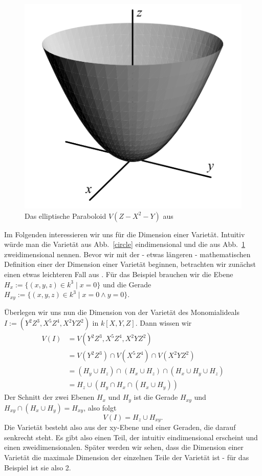 \documentclass{article}
\begin{document}
	\begin{figure}[ht]
		\centering
		\includegraphics[width=.5\linewidth]{paraboloid.png}
		\caption{Das elliptische Paraboloid \(V(Z - X^2 -Y)\) aus \cite{CLOS}}
		\label{paraboloid}
	\end{figure}

	Im Folgenden interessieren wir uns für die Dimension einer Varietät. Intuitiv würde man
	die Varietät aus Abb.~\ref{circle} eindimensional und die aus Abb.~\ref{paraboloid}
	zweidimensional nennen. Bevor wir mit der - etwas längeren - mathematischen Definition einer
	der Dimension einer Varietät beginnen, betrachten wir zunächst einen etwas leichteren Fall 
	aus \cite{CLOS}.
	Für das Beispiel brauchen wir die Ebene \(H_x := \{(x,y,z) \in k^3\;|\; x = 0\}\) und die
	Gerade \(H_{xy} := \{(x,y,z) \in k^3\;|\; x=0 \wedge y=0\}\).

	Überlegen wir uns nun die Dimension von der Varietät des Monomialideals
	\(I := (Y^2Z^3, X^5Z^4, X^2YZ^2)\) in \(k[X,Y,Z]\). Dann wissen wir
	\begin{align*}
		V(I) &= V(Y^2Z^3, X^5Z^4, X^2YZ^2) \\
		&= V(Y^2Z^3) \cap V(X^5Z^4) \cap V(X^2YZ^2) \\
		&= (H_y \cup H_z) \cap (H_x \cup H_z) \cap (H_x \cup H_y \cup H_z) \\
		&= H_z \cup (H_y \cap H_x \cap (H_x \cup H_y))
	\end{align*}
	Der Schnitt der zwei Ebenen \(H_x\) und \(H_y\) ist die Gerade \(H_{xy}\) und
	\(H_{xy} \cap (H_x \cup H_y) = H_{xy}\), also folgt
	\begin{displaymath}
		V(I) = H_z \cup H_{xy}.
	\end{displaymath}
	Die Varietät besteht also aus der xy-Ebene und einer Geraden, die darauf senkrecht steht.
	Es gibt also einen Teil, der intuitiv eindimensional erscheint und einen zweidimensionalen.
	Später werden wir sehen, dass die Dimension einer Varietät die maximale Dimension der einzelnen
	Teile der Varietät ist - für das Beispiel ist sie also 2.
	
\end{document}
